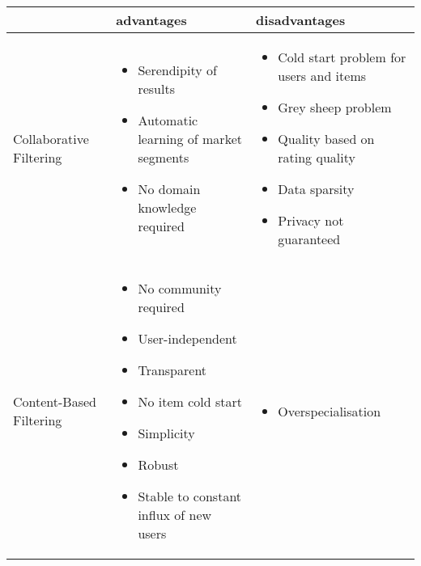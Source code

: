 \begin{table}
    \begin{center}
        \begin{tabularx}{\columnwidth}{X|X|X}
            & advantages & disadvantages \\
            \hline
            Collaborative Filtering 
            &   \begin{itemize}[noitemsep,topsep=0pt,parsep=0pt,partopsep=0pt, leftmargin=3.5mm]
                    \item Serendipity of results 
                    \item Automatic learning of market segments
                    \item No domain knowledge required
                \end{itemize}
            &   \begin{itemize}[noitemsep,topsep=0pt,parsep=0pt,partopsep=0pt, leftmargin=3.5mm]
                    \item Cold start problem for users and items
                    \item Grey sheep problem
                    \item Quality based on rating quality
                    \item Data sparsity
                    \item Privacy not guaranteed
                \end{itemize} \\
            \hline
            Content-Based Filtering 
            &   \begin{itemize}[noitemsep,topsep=0pt,parsep=0pt,partopsep=0pt, leftmargin=3.5mm]
                    \item No community required 
                    \item User-independent
                    \item Transparent
                    \item No item cold start
                    \item Simplicity
                    \item Robust
                    \item Stable to constant influx of new users
                \end{itemize}
            &   \begin{itemize}[noitemsep,topsep=0pt,parsep=0pt,partopsep=0pt, leftmargin=3.5mm]
                    \item Overspecialisation

\end{itemize}
\end{tabularx}
\end{center}
\end{table}
